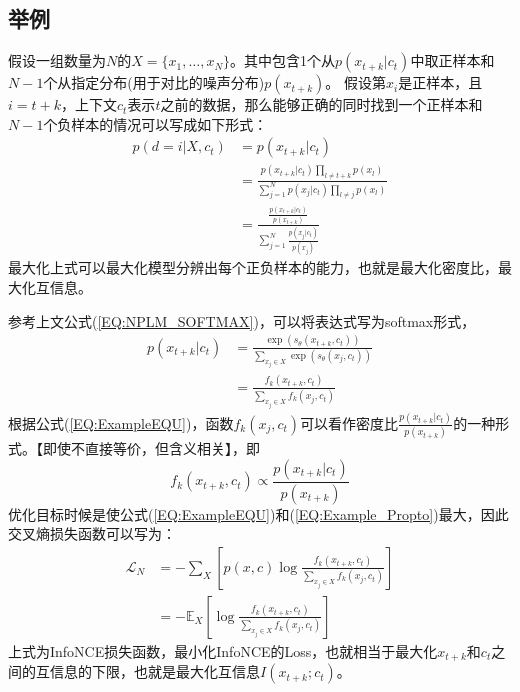 \documentclass{article}
\begin{document}
\subsection{举例}
假设一组数量为$N$的$X=\{ x_1, \ldots, x_N \}$。其中包含1个从$p(x_{t+k}|c_t)$中取正样本和$N-1$个从指定分布(用于对比的噪声分布)$p(x_{t+k})$。
假设第$x_i$是正样本，且$i=t+k$，上下文$c_t$表示$t$之前的数据，那么能够正确的同时找到一个正样本和$N-1$个负样本的情况可以写成如下形式：
\begin{equation}
    \begin{split}
        p(d=i|X,c_t) &= p(x_{t+k}|c_t) \\
        &= \frac{ p(x_{t+k}|c_t) \prod_{l \neq t+k} p(x_l) }{\sum_{j=1}^N p(x_j|c_t) \prod_{l \neq j} p(x_l) } \\
        &= \frac{\frac{p(x_{t+k}|c_t)}{p(x_{t+k})}}{\sum_{j=1}^N \frac{p(x_j|c_t)}{p(x_j)}}
    \end{split}
    \label{EQ:ExampleEQU}
\end{equation}
最大化上式可以最大化模型分辨出每个正负样本的能力，也就是最大化密度比，最大化互信息。

参考上文公式(\ref{EQ:NPLM_SOFTMAX})，可以将表达式写为softmax形式，
\begin{equation}
    \begin{split}
        p(x_{t+k}|c_t) &= \frac{\exp (s_\theta(x_{t+k},c_t))}{\sum_{x_j \in X} \exp (s_\theta (x_j,c_t))} \\
        &= \frac{f_k(x_{t+k},c_t)}{\sum_{x_j \in X} f_k(x_j, c_t)}
    \end{split}
\end{equation}
根据公式(\ref{EQ:ExampleEQU})，函数$f_k(x_j, c_t)$可以看作密度比$\frac{p(x_{t+k}|c_t)}{p(x_{t+k})}$的一种形式。【即使不直接等价，但含义相关】，即
\begin{equation}
    f_k(x_{t+k},c_t) \propto \frac{p(x_{t+k}|c_t)}{p(x_{t+k})}
    \label{EQ:Example_Propto}
\end{equation}
优化目标时候是使公式(\ref{EQ:ExampleEQU})和(\ref{EQ:Example_Propto})最大，因此交叉熵损失函数可以写为：
\begin{equation}
    \begin{split}
        \mathcal{L}_N &= - \sum_{X} [p(x,c) \log \frac{f_k(x_{t+k},c_t)}{\sum_{x_j \in X} f_k(x_j, c_t)} ] \\
        &= - \mathbb{E}_X [\log \frac{f_k(x_{t+k},c_t)}{\sum_{x_j \in X} f_k(x_j, c_t)}]
    \end{split}
\end{equation}
上式为InfoNCE损失函数，最小化InfoNCE的Loss，也就相当于最大化$x_{t+k}$和$c_t$之间的互信息的下限，也就是最大化互信息$I(x_{t+k};c_t)$。
\end{document}
